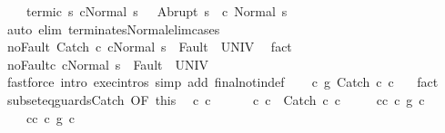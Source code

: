 \begin{isabellebody}
\ \ \ \ termi{\isacharunderscore}c{}{\isacharprime}{\isacharcolon}\ {\isachardoublequoteopen}{\isasymforall}s{\isacharprime}{\isachardot}\ {\isasymGamma}{\isasymturnstile}{\isasymlangle}c{}{\isacharprime}{\isacharcomma}Normal\ s\ {\isasymrangle}\ {\isasymRightarrow}\ Abrupt\ s{\isacharprime}\ {\isasymlongrightarrow}\ {\isasymGamma}{\isasymturnstile}c{}{\isacharprime}{\isasymdown}\ Normal\ s{\isacharprime}{\isachardoublequoteclose}\isanewline
\ \ \ \ \isamarkupfalse%
\ {\isacharparenleft}auto\ elim{\isacharcolon}\ terminates{\isacharunderscore}Normal{\isacharunderscore}elim{\isacharunderscore}cases{\isacharparenright}\isanewline
\ \ \isamarkupfalse%
\ noFault{\isacharcolon}\ {\isachardoublequoteopen}{\isasymGamma}{\isasymturnstile}{\isasymlangle}Catch\ c{}{\isacharprime}\ c{}{\isacharprime}{\isacharcomma}Normal\ s\ {\isasymrangle}\ {\isasymRightarrow}{\isasymnotin}Fault\ {\isacharbackquote}\ UNIV{\isachardoublequoteclose}\ \isamarkupfalse%
\ fact\isanewline
\ \ \isamarkupfalse%
\ noFault{\isacharunderscore}c{}{\isacharprime}{\isacharcolon}\ {\isachardoublequoteopen}{\isasymGamma}{\isasymturnstile}{\isasymlangle}c{}{\isacharprime}{\isacharcomma}Normal\ s\ {\isasymrangle}\ {\isasymRightarrow}{\isasymnotin}Fault\ {\isacharbackquote}\ UNIV{\isachardoublequoteclose}\isanewline
\ \ \ \ \isamarkupfalse%
\ {\isacharparenleft}fastforce\ intro{\isacharcolon}\ exec{\isachardot}intros\ simp\ add{\isacharcolon}\ final{\isacharunderscore}notin{\isacharunderscore}def{\isacharparenright}\isanewline
\ \ \isamarkupfalse%
\ {\isachardoublequoteopen}c\ {\isasymsubseteq}\isactrlsub g\ Catch\ c{}{\isacharprime}\ c{}{\isacharprime}{\isachardoublequoteclose}\ \ \isamarkupfalse%
\ fact\isanewline
\ \ \isamarkupfalse%
\ subseteq{\isacharunderscore}guards{\isacharunderscore}Catch\ {\isacharbrackleft}OF\ this{\isacharbrackright}\ \isamarkupfalse%
\ c{}\ c{}\ \ \isanewline
\ \ \ \ c{\isacharcolon}\ {\isachardoublequoteopen}c\ {\isacharequal}\ Catch\ c{}\ c{}{\isachardoublequoteclose}\ \isanewline
\ \ \ \ c{}{\isacharunderscore}c{}{\isacharprime}{\isacharcolon}\ {\isachardoublequoteopen}c{}\ {\isasymsubseteq}\isactrlsub g\ c{}{\isacharprime}{\isachardoublequoteclose}\ \isanewline
\ \ \ \ c{}{\isacharunderscore}c{}{\isacharprime}{\isacharcolon}\ {\isachardoublequoteopen}c{}\ {\isasymsubseteq}\isactrlsub g\ c{}{\isacharprime}{\isachardoublequoteclose}\ \isanewline

\end{isabellebody}
